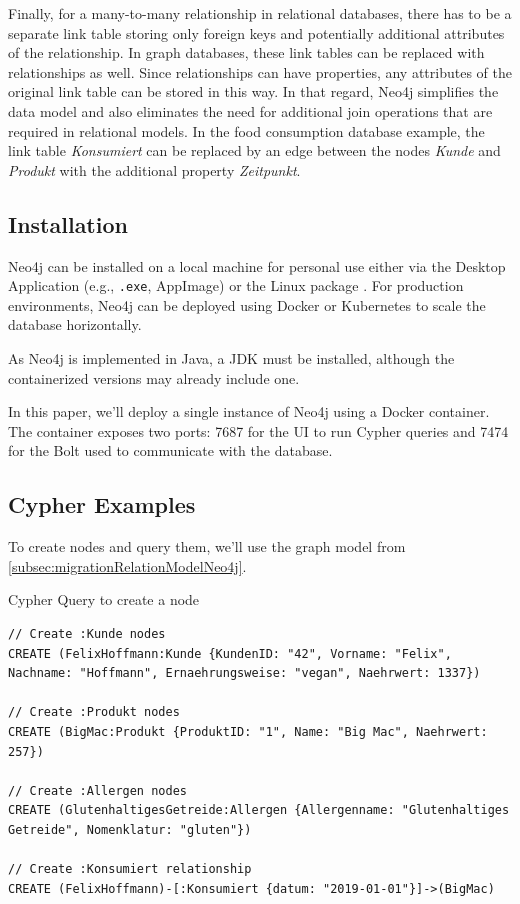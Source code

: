 Finally, for a many-to-many relationship in relational databases, there has to be a separate link table storing only foreign keys and potentially additional attributes of the relationship. In graph databases, these link tables can be replaced with relationships as well. Since relationships can have properties, any attributes of the original link table can be stored in this way. In that regard, Neo4j simplifies the data model and also eliminates the need for additional join operations that are required in relational models. In the food consumption database example, the link table \textit{Konsumiert} can be replaced by an edge between the nodes \textit{Kunde} and \textit{Produkt} with the additional property \textit{Zeitpunkt}.

\subsection{Installation} \label{subsec:installationNeo4j}

Neo4j can be installed on a local machine for personal use either via the Desktop Application (e.g., \texttt{.exe}, AppImage) or the Linux package \parencite{neo4j_neo4j_nodate}. For production environments, Neo4j can be deployed using Docker \parencite{neo4j_docs_introduction_nodate} or Kubernetes to scale the database horizontally.

As Neo4j is implemented in Java, a \ac{JDK} must be installed, although the containerized versions may already include one.

In this paper, we'll deploy a single instance of Neo4j using a Docker container. The container exposes two ports: \num{7687} for the \ac{UI} to run Cypher queries and \num{7474} for the \ac{Bolt} used to communicate with the database.

\subsection{Cypher Examples} \label{subsec:queryingNeo4j}

To create nodes and query them, we'll use the graph model from \autoref{subsec:migrationRelationModelNeo4j}.

\begin{code}[H]
    \caption{Cypher Query to create a node} \label{code:cypherCreateNode}
    \begin{verbatim}
// Create :Kunde nodes
CREATE (FelixHoffmann:Kunde {KundenID: "42", Vorname: "Felix", Nachname: "Hoffmann", Ernaehrungsweise: "vegan", Naehrwert: 1337})

// Create :Produkt nodes
CREATE (BigMac:Produkt {ProduktID: "1", Name: "Big Mac", Naehrwert: 257})

// Create :Allergen nodes
CREATE (GlutenhaltigesGetreide:Allergen {Allergenname: "Glutenhaltiges Getreide", Nomenklatur: "gluten"})

// Create :Konsumiert relationship
CREATE (FelixHoffmann)-[:Konsumiert {datum: "2019-01-01"}]->(BigMac)
    \end{verbatim}
\end{code}


